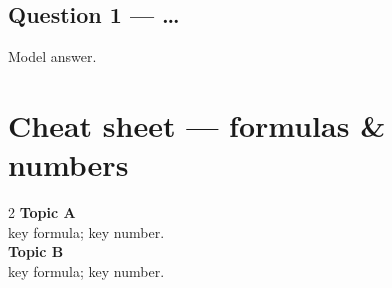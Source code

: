 \documentclass[11pt,a4paper]{report}
\begin{document}
\section*{Question 1 — \dots}
Model answer.

\appendix
\chapter{Cheat sheet — formulas \& numbers}
\begin{multicols}{2}
\small
\textbf{\color{dwblue}Topic A}\\
key formula; key number.\\[4pt]
\textbf{\color{dwblue}Topic B}\\
key formula; key number.
\end{multicols}
\end{document}
